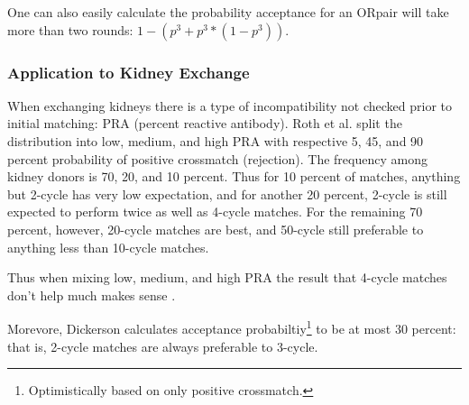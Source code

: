 \documentclass[main.tex]{subfiles}
\begin{document}
One can also easily calculate the probability acceptance for an ORpair will take more than two rounds: $1 - (p^3 + p^3 * (1 - p^3))$.

\subsubsection{Application to Kidney Exchange}
When exchanging kidneys there is a type of incompatibility not checked prior to initial matching: PRA (percent reactive antibody). Roth et al. \cite{Rot2} split the distribution into low, medium, and high PRA with respective 5, 45, and 90 percent probability of positive crossmatch (rejection). The frequency among kidney donors is 70, 20, and 10 percent. Thus for 10 percent of matches, anything but 2-cycle has very low expectation, and for another 20 percent, 2-cycle is still expected to perform twice as well as 4-cycle matches. For the remaining 70 percent, however, 20-cycle matches are best, and 50-cycle still preferable to anything less than 10-cycle matches.

Thus when mixing low, medium, and high PRA the result that 4-cycle matches don't help much makes sense \cite{Rot2}.

Morevore, Dickerson \cite{Dick} \cite{Dick3} calculates acceptance probabiltiy\footnote{Optimistically based on only positive crossmatch.} to be at most $30$ percent: that is, 2-cycle matches are always preferable to 3-cycle.
\end{document}
